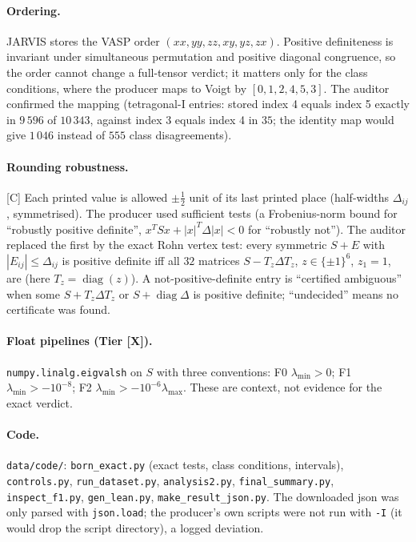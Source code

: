 \documentclass[10pt]{article}
\newcommand{\tier}[1]{\textsf{[#1]}}
\newcommand{\tC}{\tier{C}}
\newcommand{\tX}{\tier{X}}
\begin{document}
\paragraph{Ordering.} JARVIS stores the VASP order $(xx,yy,zz,xy,yz,zx)$. Positive definiteness is invariant under simultaneous permutation and positive diagonal congruence, so the order cannot change a full-tensor verdict; it matters only for the class conditions, where the producer maps to Voigt by $[0,1,2,4,5,3]$. The auditor confirmed the mapping (tetragonal-I entries: stored index 4 equals index 5 exactly in $9\,596$ of $10\,343$, against index 3 equals index 4 in $35$; the identity map would give $1\,046$ instead of $555$ class disagreements).

\paragraph{Rounding robustness.}\tC{} Each printed value is allowed $\pm\tfrac12$ unit of its last printed place (half-widths $\Delta_{ij}$, symmetrised). The producer used sufficient tests (a Frobenius-norm bound for ``robustly positive definite'', $x^TSx+|x|^T\Delta|x|<0$ for ``robustly not''). The auditor replaced the first by the exact Rohn vertex test: every symmetric $S+E$ with $|E_{ij}|\le\Delta_{ij}$ is positive definite iff all $32$ matrices $S-T_z\Delta T_z$, $z\in\{\pm1\}^6$, $z_1=1$, are (here $T_z=\operatorname{diag}(z)$). A not-positive-definite entry is ``certified ambiguous'' when some $S+T_z\Delta T_z$ or $S+\operatorname{diag}\Delta$ is positive definite; ``undecided'' means no certificate was found.

\paragraph{Float pipelines (Tier \tX).} \texttt{numpy.linalg.eigvalsh} on $S$ with three conventions: F0 $\lambda_{\min}>0$; F1 $\lambda_{\min}>-10^{-8}$; F2 $\lambda_{\min}>-10^{-6}\lambda_{\max}$. These are context, not evidence for the exact verdict.

\paragraph{Code.} \texttt{data/code/}: \texttt{born\_exact.py} (exact tests, class conditions, intervals), \texttt{controls.py}, \texttt{run\_dataset.py}, \texttt{analysis2.py}, \texttt{final\_summary.py}, \texttt{inspect\_f1.py}, \texttt{gen\_lean.py}, \texttt{make\_result\_json.py}. The downloaded json was only parsed with \texttt{json.load}; the producer's own scripts were not run with \texttt{-I} (it would drop the script directory), a logged deviation.
\end{document}

